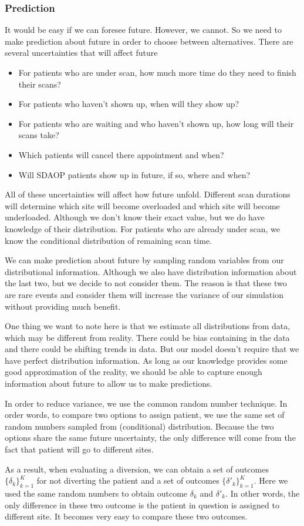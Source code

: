 \subsubsection{Prediction}

It would be easy if we can foresee future. However, we cannot. So we need to make prediction about future in order to choose between alternatives. There are several uncertainties that will affect future

\begin{itemize}
\item For patients who are under scan, how much more time do they need
to finish their scans?
\item For patients who haven't shown up, when will they show up?
\item For patients who are waiting and who haven't shown up, how long
will their scans take?
\item Which patients will cancel there appointment and when?
\item Will SDAOP patients show up in future, if so, where and when?
\end{itemize}

All of these uncertainties will affect how future unfold. Different scan durations will determine which site will become overloaded and which site will become underloaded. Although we don't know their exact value, but we do have knowledge of their distribution. For patients who are already under scan, we know the conditional distribution of remaining scan time.

We can make prediction about future by sampling random variables from our distributional information. Although we also have distribution information about the last two, but we decide to not consider them. The reason is that these two are rare events and consider them will increase the variance of our simulation without providing much benefit.

One thing we want to note here is that we estimate all distributions from data, which may be different from reality. There could be bias
containing in the data and there could be shifting trends in data. But our model doesn't require that we have perfect distribution
information. As long as our knowledge provides some good approximation of the reality, we should be able to capture enough information about future to allow us to make predictions.

In order to reduce variance, we use the common random number technique. In order words, to compare two options to assign patient, we use the same set of random numbers sampled from (conditional) distribution. Because the two options share the same future uncertainty, the only difference will come from the fact that patient will go to different sites.

As a result, when evaluating a diversion, we can obtain a set of outcomes $\{\delta_k\}_{k=1}^K$ for not diverting the patient and a set of outcomes $\{\delta'_k\}_{k=1}^K$. Here we used the same random numbers to obtain outcome $\delta_k$ and $\delta'_k$. In other words, the only difference in these two outcome is the patient in question is assigned to different site. It becomes very easy to compare these two outcomes.

